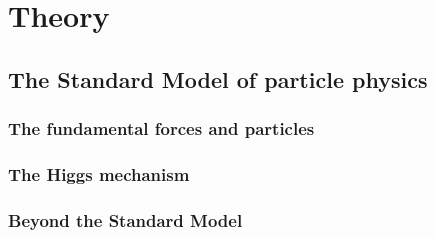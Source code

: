 \chapter{Theory}
\label{chap:theory}


\section{The Standard Model of particle physics}
\label{sec:sm}



\subsection{The fundamental forces and particles}






\subsection{The Higgs mechanism}

\subsection{Beyond the Standard Model}

